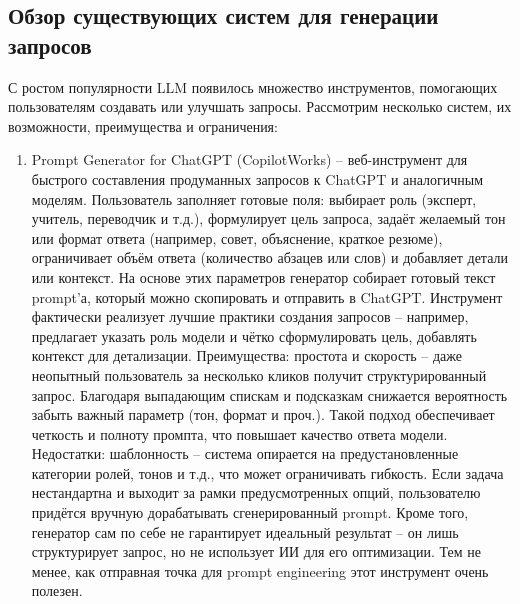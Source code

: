 \subsection{Обзор существующих систем для генерации запросов} С ростом популярности LLM появилось множество инструментов, помогающих пользователям создавать или улучшать запросы. Рассмотрим несколько систем, их возможности, преимущества и ограничения:
\begin{enumerate}[label=\arabic*]
\item Prompt Generator for ChatGPT (CopilotWorks) – веб-инструмент для быстрого составления продуманных запросов к ChatGPT и аналогичным моделям. Пользователь заполняет готовые поля: выбирает роль (эксперт, учитель, переводчик и т.д.), формулирует цель запроса, задаёт желаемый тон или формат ответа (например, совет, объяснение, краткое резюме), ограничивает объём ответа (количество абзацев или слов) и добавляет детали или контекст\cite{copilotworks:promptgen}.  На основе этих параметров генератор собирает готовый текст prompt’а, который можно скопировать и отправить в ChatGPT\cite{copilotworks:promptgen}. Инструмент фактически реализует лучшие практики создания запросов – например, предлагает указать роль модели и чётко сформулировать цель, добавлять контекст для детализации\cite{copilotworks:promptgen}. Преимущества: простота и скорость – даже неопытный пользователь за несколько кликов получит структурированный запрос. Благодаря выпадающим спискам и подсказкам снижается вероятность забыть важный параметр (тон, формат и проч.). Такой подход обеспечивает четкость и полноту промпта, что повышает качество ответа модели. Недостатки: шаблонность – система опирается на предустановленные категории ролей, тонов и т.д., что может ограничивать гибкость. Если задача нестандартна и выходит за рамки предусмотренных опций, пользователю придётся вручную дорабатывать сгенерированный prompt. Кроме того, генератор сам по себе не гарантирует идеальный результат – он лишь структурирует запрос, но не использует ИИ для его оптимизации. Тем не менее, как отправная точка для prompt engineering этот инструмент очень полезен.


\end{enumerate}
